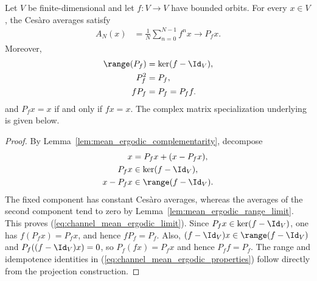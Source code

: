 \begin{theorem}
    \label{thm:mean_ergodic_bounded_orbits}
    \leanok
    Let $V$ be finite-dimensional and let $f:V\to V$ have bounded orbits.
    For every $x\in V$, the Ces\`aro averages satisfy
    \begin{align}
        A_N(x)
         & =\frac{1}{N}\sum_{n=0}^{N-1}f^nx
        \longrightarrow P_fx.
        \label{eq:channel_mean_ergodic_limit}
    \end{align}
    Moreover,
    \begin{align}
        \range(P_f) & =\ker(f-\Id_V), \notag \\
        P_f^2       & =P_f, \notag           \\
        fP_f        & =P_f=P_ff.
        \label{eq:channel_mean_ergodic_properties}
    \end{align}
    and $P_fx=x$ if and only if $fx=x$.
    The complex matrix specialization underlying
    \cite[Equation~(6.14)]{Wolf2012Quantum} is given below.
\end{theorem}

\begin{proof}\leanok
    By Lemma~\ref{lem:mean_ergodic_complementarity}, decompose
    \begin{align}
        x      & =P_fx+(x-P_fx), \notag   \\
        P_fx   & \in\ker(f-\Id_V), \notag \\
        x-P_fx & \in\range(f-\Id_V).
    \end{align}
    The fixed component has constant Ces\`aro averages, whereas the averages
    of the second component tend to zero by
    Lemma~\ref{lem:mean_ergodic_range_limit}. This proves
    (\ref{eq:channel_mean_ergodic_limit}). Since
    $P_fx\in\ker(f-\Id_V)$, one has $f(P_fx)=P_fx$, and hence
    $fP_f=P_f$. Also, $(f-\Id_V)x\in\range(f-\Id_V)$ and
    $P_f((f-\Id_V)x)=0$, so $P_f(fx)=P_fx$ and hence $P_ff=P_f$.
    The range and idempotence identities in
    (\ref{eq:channel_mean_ergodic_properties}) follow directly from the
    projection construction.
\end{proof}

